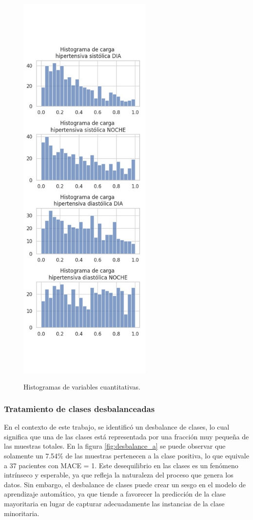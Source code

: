 \begin{figure}[H]
	[0.45\linewidth]{\includegraphics[height=20cm]{./Figures/histograma_dataset1b.png}}
	\caption{Histogramas de variables cuantitativas.}\label{fig:histogram_1}
\end{figure}


\subsubsection{Tratamiento de clases desbalanceadas }
En el contexto de este trabajo, se identificó un desbalance de clases, lo cual significa que una de las clases 
está representada por una fracción muy pequeña de las muestras totales. En la figura \ref{fig:desbalance_a} se puede 
observar que solamente un 7.54\% de las muestras pertenecen a la clase positiva, lo que equivale a 37 pacientes con MACE = 1. 
Este desequilibrio en las clases es un fenómeno intrínseco y esperable, ya que refleja la naturaleza del proceso 
que genera los datos. Sin embargo, el desbalance de clases puede crear un sesgo en el modelo de aprendizaje 
automático, ya que tiende a favorecer la predicción de la clase mayoritaria en lugar de capturar adecuadamente 
las instancias de la clase minoritaria. 

